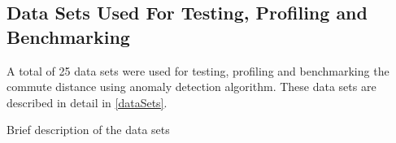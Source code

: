 \subsection{Data Sets Used For Testing, Profiling and Benchmarking}
\label{software:datasets}
A total of 25 data sets were used for testing, profiling and benchmarking the
commute distance using anomaly detection algorithm. These data sets are
described in detail in \autoref{dataSets}.

\begin{table}
    \centering
    \begin{datasets}
    \end{datasets}
    \caption{Brief description of the data sets}
    \label{dataSets:brief}
\end{table}